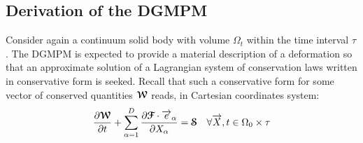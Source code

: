 

\subsection{Derivation of the DGMPM}
Consider again a continuum solid body with volume $\Omega_t$ within the time interval $\tau$. The DGMPM is expected to provide a material description of a deformation so that an approximate solution of a Lagrangian system of conservation laws written in conservative form is seeked. Recall that such a conservative form for some vector of conserved quantities ${\boldsymbol{\mathcal{W}}}$ reads, in Cartesian coordinates system:
\begin{equation}
  \label{eq:conservative_form}
  \frac{\partial {\boldsymbol{\mathcal{W}}}}{\partial t} + \sum_{\alpha=1}^D \frac{\partial {\boldsymbol{\mathcal{F}}}\cdot {\overrightarrow{e}}_\alpha}{\partial X_\alpha} = {\boldsymbol{\mathcal{S}}} \quad \forall {\overrightarrow{X}},t \in \Omega_0 \times \tau
\end{equation}

